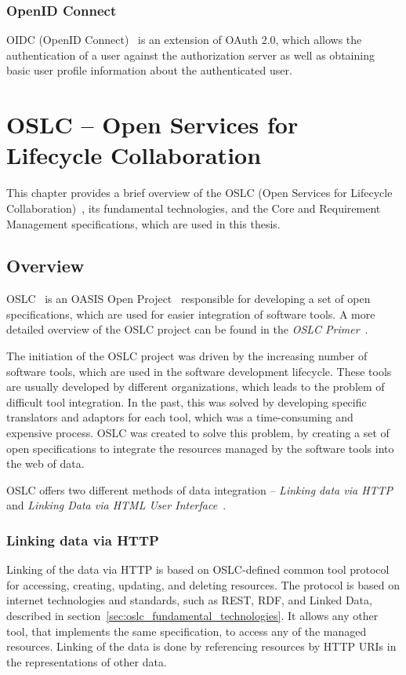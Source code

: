 \subsection*{OpenID Connect}
OIDC (OpenID Connect) \cite{oidc} is an extension of OAuth 2.0, which allows the authentication of a user against the authorization server as well as obtaining basic user profile information about the authenticated user.


\chapter{OSLC -- Open Services for Lifecycle Collaboration}
This chapter provides a brief overview of the OSLC (Open Services for Lifecycle Collaboration) \cite{oslc}, its fundamental technologies, and the Core and Requirement Management specifications, which are used in this thesis.

\section{Overview}
OSLC \cite{oslc} is an OASIS Open Project \cite{oasis_open} responsible for developing a set of open specifications, which are used for easier integration of software tools. A more detailed overview of the OSLC project can be found in the \emph{OSLC Primer} \cite{oslc_primer}.

The initiation of the OSLC project was driven by the increasing number of software tools, which are used in the software development lifecycle. These tools are usually developed by different organizations, which leads to the problem of difficult tool integration. In the past, this was solved by developing specific translators and adaptors for each tool, which was a time-consuming and expensive process. OSLC was created to solve this problem, by creating a set of open specifications to integrate the resources managed by the software tools into the web of data.

OSLC offers two different methods of data integration -- \emph{Linking data via HTTP} and \emph{Linking Data via HTML User Interface} \cite{oslc_primary_integration_techniques}.


\subsection*{Linking data via HTTP}
Linking of the data via HTTP is based on OSLC-defined common tool protocol for accessing, creating, updating, and deleting resources. The protocol is based on internet technologies and standards, such as REST, RDF, and Linked Data, described in section \ref{sec:oslc_fundamental_technologies}. It allows any other tool, that implements the same specification, to access any of the managed resources. Linking of the data is done by referencing resources by HTTP URIs in the representations of other data.

